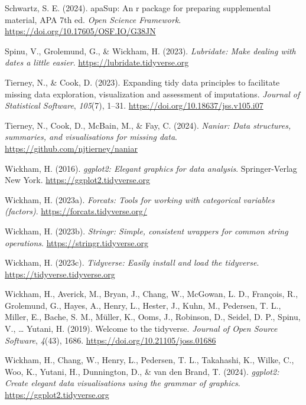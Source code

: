 \documentclass[
]{article}
\newlength{\cslhangindent}
\newlength{\cslentryspacingunit} %
\newenvironment{CSLReferences}[2] %
 {%
  \setlength{\parindent}{0pt}
  \ifodd #1
  \let\oldpar\par
  \def\par{\hangindent=\cslhangindent\oldpar}
  \fi
  \setlength{\parskip}{#2\cslentryspacingunit}
 }%
 {}
\begin{document}
\begin{CSLReferences}{1}{0}
\leavevmode{}%
Schwartz, S. E. (2024). apaSup: An r package for preparing supplemental
material, APA 7th ed. \emph{Open Science Framework}.
\url{https://doi.org/10.17605/OSF.IO/G38JN}

\leavevmode{}%
Spinu, V., Grolemund, G., \& Wickham, H. (2023). \emph{Lubridate: Make
dealing with dates a little easier}.
\url{https://lubridate.tidyverse.org}

\leavevmode{}%
Tierney, N., \& Cook, D. (2023). Expanding tidy data principles to
facilitate missing data exploration, visualization and assessment of
imputations. \emph{Journal of Statistical Software}, \emph{105}(7),
1--31. \url{https://doi.org/10.18637/jss.v105.i07}

\leavevmode{}%
Tierney, N., Cook, D., McBain, M., \& Fay, C. (2024). \emph{Naniar: Data
structures, summaries, and visualisations for missing data}.
\url{https://github.com/njtierney/naniar}

\leavevmode{}%
Wickham, H. (2016). \emph{ggplot2: Elegant graphics for data analysis}.
Springer-Verlag New York. \url{https://ggplot2.tidyverse.org}

\leavevmode{}%
Wickham, H. (2023a). \emph{Forcats: Tools for working with categorical
variables (factors)}. \url{https://forcats.tidyverse.org/}

\leavevmode{}%
Wickham, H. (2023b). \emph{Stringr: Simple, consistent wrappers for
common string operations}. \url{https://stringr.tidyverse.org}

\leavevmode{}%
Wickham, H. (2023c). \emph{Tidyverse: Easily install and load the
tidyverse}. \url{https://tidyverse.tidyverse.org}

\leavevmode{}%
Wickham, H., Averick, M., Bryan, J., Chang, W., McGowan, L. D.,
François, R., Grolemund, G., Hayes, A., Henry, L., Hester, J., Kuhn, M.,
Pedersen, T. L., Miller, E., Bache, S. M., Müller, K., Ooms, J.,
Robinson, D., Seidel, D. P., Spinu, V., \ldots{} Yutani, H. (2019).
Welcome to the {tidyverse}. \emph{Journal of Open Source Software},
\emph{4}(43), 1686. \url{https://doi.org/10.21105/joss.01686}

\leavevmode{}%
Wickham, H., Chang, W., Henry, L., Pedersen, T. L., Takahashi, K.,
Wilke, C., Woo, K., Yutani, H., Dunnington, D., \& van den Brand, T.
(2024). \emph{ggplot2: Create elegant data visualisations using the
grammar of graphics}. \url{https://ggplot2.tidyverse.org}


\end{CSLReferences}
\end{document}

